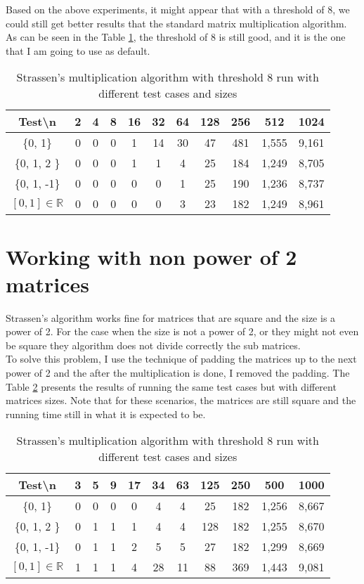 \documentclass[tikz, 12pt]{scrartcl}
\begin{document}
Based on the above experiments, it might appear that with a threshold of 8, we could still get better results that the standard matrix multiplication algorithm. As can be seen in the Table \ref{strassen8}, the threshold of 8 is still good, and it is the one that I am going to use as default.

\begin{table}[h!]
\caption{Strassen's multiplication algorithm with threshold 8 run with different test cases and sizes\label{strassen8}}
\centering
\begin{tabular}{|c|cccccccccc|}
\hline
Test\textbackslash  n		&	2	&	4	&	8	&	16	&	32	&	64	&	128		&	256		&	512		&	1024\\
\hline
\{0, 1\}				&	0	&	0	&	0	&	1	&	14	&	30	&	47		&	481		&	1,555	&	9,161\\
\{0, 1, 2 \}				&	0	&	0	&	0	&	1	&	1	&	4	&	25		&	184		&	1,249	&	8,705\\
\{0, 1, -1\}				&	0	&	0	&	0	&	0	&	0	&	1	&	25		&	190		&	1,236	&	8,737\\
$[0, 1] \in \mathbb{R}$	&	0	&	0	&	0	&	0	&	0	&	3	&	23		&	182		&	1,249	&	8,961\\
\hline
\end{tabular}
\end{table}

\section{Working with non power of 2 matrices}

Strassen's algorithm works fine for matrices that are square and the size is a power of 2. For the case when the size is not a power of 2, or they might not even be square they algorithm does not divide correctly the sub matrices. \\
To solve this problem, I use the technique of padding the matrices up to the next power of 2 and the after the multiplication is done, I removed the padding. The Table \ref{strassenPadding} presents the results of running the same test cases but with different matrices sizes. Note that for these scenarios, the matrices are still square and the running time still in what it is expected to be.

\begin{table}[h!]
\caption{Strassen's multiplication algorithm with threshold 8 run with different test cases and sizes\label{strassenPadding}}
\centering
\begin{tabular}{|c|cccccccccc|}
\hline
Test\textbackslash  n		&	3	&	5	&	9	&	17	&	34	&	63	&	125		&	250		&	500		&	1000\\
\hline
\{0, 1\}				&	0	&	0	&	0	&	0	&	4	&	4	&	25		&	182		&	1,256	&	8,667\\
\{0, 1, 2 \}				&	0	&	1	&	1	&	1	&	4	&	4	&	128		&	182		&	1,255	&	8,670\\
\{0, 1, -1\}				&	0	&	1	&	1	&	2	&	5	&	5	&	27		&	182		&	1,299	&	8,669\\
$[0, 1] \in \mathbb{R}$	&	1	&	1	&	1	&	4	&	28	&	11	&	88		&	369		&	1,443	&	9,081\\
\hline
\end{tabular}
\end{table}
\end{document}

